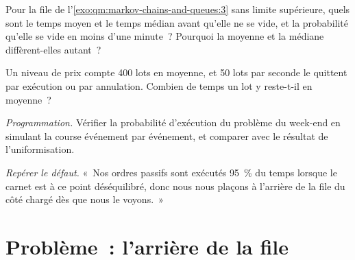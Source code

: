 \begin{exercise}[$\star\star$]\label{exo:qm:markov-chains-and-queues:5}
Pour la file de l'\cref{exo:qm:markov-chains-and-queues:3} sans limite supérieure, quels sont le temps moyen et le temps médian
avant qu'elle ne se vide, et la probabilité qu'elle se vide en moins d'une minute~? Pourquoi la moyenne et la médiane diffèrent-elles autant~?
\end{exercise}

\begin{exercise}[$\star\star$]\label{exo:qm:markov-chains-and-queues:6}
Un niveau de prix compte 400 lots en moyenne, et 50 lots par seconde le quittent par exécution ou par annulation. Combien de temps
un lot y reste-t-il en moyenne~?
\end{exercise}

\begin{exercise}[$\star\star\star$]\label{exo:qm:markov-chains-and-queues:7}
\emph{Programmation.} Vérifier la probabilité d'exécution du problème du week-end en simulant la course événement par événement, et
comparer avec le résultat de l'uniformisation.
\end{exercise}

\begin{exercise}[$\star\star\star$]\label{exo:qm:markov-chains-and-queues:8}
\emph{Repérer le défaut.} «~Nos ordres passifs sont exécutés 95~\% du temps lorsque le carnet est à ce point déséquilibré, donc
nous nous plaçons à l'arrière de la file du côté chargé dès que nous le voyons.~»
\end{exercise}

\section{Problème~: l'arrière de la file}

